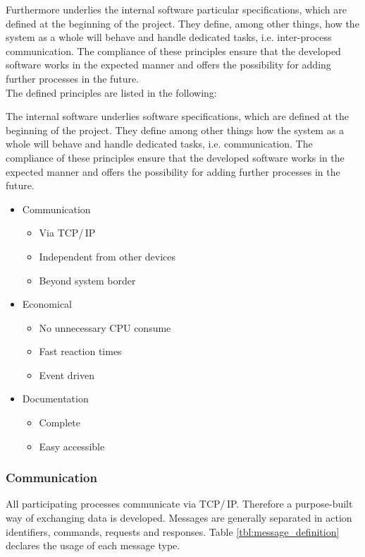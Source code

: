 Furthermore underlies the internal software particular specifications, which are defined at the beginning of the project. They define, among other things, how the system as a whole will behave and handle dedicated tasks, i.e. inter-process communication. The compliance of these principles ensure that the developed software works in the expected manner and offers the possibility for adding further processes in the future.\\

The defined principles are listed in the following:

The internal software underlies software specifications, which are defined at the beginning of the project. They define among other things how the system as a whole will behave and handle dedicated tasks, i.e. communication. The compliance of these principles ensure that the developed software works in the expected manner and offers the possibility for adding further processes in the future.


\begin{itemize}
\itemsep0em
\item Communication
	\begin{itemize}
	\item Via TCP/\,IP
	\item Independent from other devices
	\item Beyond system border
	\end{itemize}
	
\item Economical
	\begin{itemize}
	\item No unnecessary CPU consume
	\item Fast reaction times
	\item Event driven
	\end{itemize}
	
\item Documentation
	\begin{itemize}
	\item Complete
	\item Easy accessible
	\end{itemize}
\end{itemize}

\subsubsection{Communication}

All participating processes communicate via TCP/\,IP. Therefore a purpose-built way of exchanging data is developed. Messages are generally separated in action identifiers, commands, requests and responses. Table \ref{tbl:message_definition} declares the usage of each message type.


